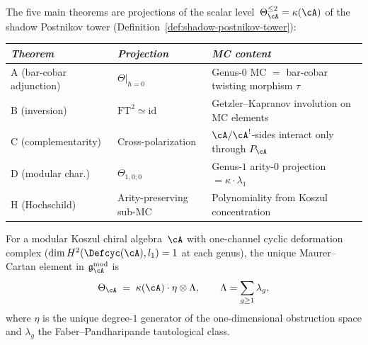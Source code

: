 \begin{remark}
\label{rem:five-from-one}
The five main theorems are projections of the scalar
level~$\Theta_{\cA}^{\leq 2} = \kappa(\cA)$ of the
shadow Postnikov tower
(Definition~\ref{def:shadow-postnikov-tower}):
\begin{center}
\small
\renewcommand{\arraystretch}{1.2}
\begin{tabular}{lll}
\toprule
\emph{Theorem} & \emph{Projection} & \emph{MC content} \\
\midrule
A (bar-cobar adjunction) &
  $\Theta|_{\hbar=0}$ &
  Genus-$0$ MC $= $ bar-cobar twisting morphism $\tau$ \\
B (inversion) &
  $\mathrm{FT}^2 \simeq \mathrm{id}$ &
  Getzler--Kapranov involution on MC elements \\
C (complementarity) &
  Cross-polarization &
  $\cA/\cA^!$-sides interact only through $P_{\cA}$ \\
D (modular char.) &
  $\Theta_{1,0;0}$ &
  Genus-$1$ arity-$0$ projection $= \kappa \cdot \lambda_1$ \\
H (Hochschild) &
  Arity-preserving sub-MC &
  Polynomiality from Koszul concentration \\
\bottomrule
\end{tabular}
\end{center}
\end{remark}

\begin{theorem}
\label{thm:theta-direct-derivation}
For a modular Koszul chiral algebra~$\cA$ with one-channel cyclic
deformation complex
\textup{(}$\dim H^2(\Defcyc(\cA), l_1) = 1$ at each genus\textup{)},
the unique Maurer--Cartan element in
$\mathfrak{g}_{\cA}^{\mathrm{mod}}$ is
\begin{equation}\label{eq:theta-explicit-direct}
\Theta_{\cA}
\;=\;
\kappa(\cA) \cdot \eta \otimes \Lambda,
\qquad
\Lambda = \sum_{g \geq 1} \lambda_g,
\end{equation}
where $\eta$ is the unique degree-$1$ generator of the
one-dimensional obstruction space and $\lambda_g$ the
Faber--Pandharipande tautological class.
\end{theorem}

